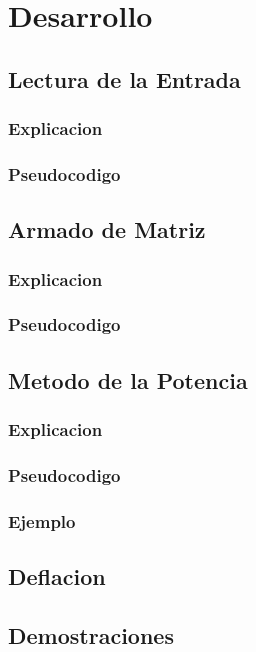 \section{Desarrollo}
\subsection{Lectura de la Entrada}

\subsubsection{Explicacion}

\subsubsection{Pseudocodigo}

\subsection{Armado de Matriz}

\subsubsection{Explicacion}

\subsubsection{Pseudocodigo}

\subsection{Metodo de la Potencia}

\subsubsection{Explicacion}

\subsubsection{Pseudocodigo}

\subsubsection{Ejemplo}

\subsection{Deflacion}


\subsection{Demostraciones}

